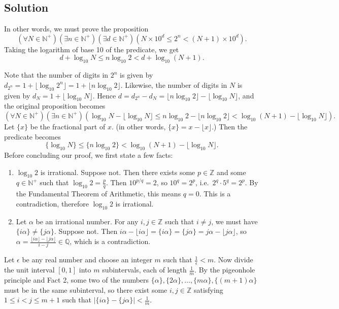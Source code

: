 \documentclass{article}
\begin{document}
\subsection*{Solution}
    In other words, we must prove the proposition $$(\forall N \in \mathbb{N}^{+})(\exists n \in \mathbb{N}^{+})(\exists d \in \mathbb{N}^{+})(N \times 10^{d} \le 2^{n} < (N + 1) \times 10^{d}).$$ Taking the logarithm of base 10 of the predicate, we get $$d + \log_{10}N \le n \log_{10}2 < d + \log_{10}(N + 1).$$
    
    Note that the number of digits in $2^{n}$ is given by $d_{2^{n}} = 1 + \lfloor \log_{10}2^{n} \rfloor = 1 + \lfloor n\log_{10}2 \rfloor$. Likewise, the number of digits in $N$ is given by $d_{N} = 1 + \lfloor \log_{10}N \rfloor$. Hence $d = d_{2^{n}} - d_{N} = \lfloor n\log_{10}2 \rfloor - \lfloor \log_{10}N \rfloor$, and the original proposition becomes $$(\forall N \in \mathbb{N}^{+})(\exists n \in \mathbb{N}^{+}) (\log_{10}N - \lfloor \log_{10}N \rfloor \le n \log_{10}2 - \lfloor n\log_{10}2 \rfloor  < \log_{10}(N + 1) - \lfloor \log_{10}N \rfloor).$$ Let $\{x\}$ be the fractional part of $x$. (in other words, $\{x\} = x - \lfloor x \rfloor$.) Then the predicate becomes 
    \begin{equation}
        \{\log_{10}N\} \le \{n \log_{10}2\} < \log_{10}(N + 1) - \lfloor \log_{10}N \rfloor.
    \end{equation}
    Before concluding our proof, we first state a few facts:
    \begin{enumerate}[label = \textbf{Fact \arabic*:}, leftmargin = *]
        \item $\log_{10} 2$ is irrational. Suppose not. Then there exists some $p \in \mathbb{Z}$ and some $q \in \mathbb{N^{+}}$ such that $\log_{10}2 = \frac{p}{q}$. Then $10^{p/q} = 2$, so $10^{q} = 2^{p}$, i.e.\ $2^{q} \cdot 5^{q} = 2^{p}$. By the Fundamental Theorem of Arithmetic, this means $q = 0$. This is a contradiction, therefore $\log_{10}2$ is irrational.
        \item  Let $\alpha$ be an irrational number. For any $i, j \in \mathbb{Z}$ such that $i \ne j$, we must have $\{i\alpha\} \ne \{j\alpha\}$. Suppose not. Then $i\alpha - \lfloor i\alpha \rfloor =  \{i\alpha\} = \{j\alpha\} = j\alpha - \lfloor j\alpha \rfloor$, so $\alpha = \frac{\lfloor i\alpha \rfloor - \lfloor j\alpha \rfloor}{i- j} \in \mathbb{Q}$, which is a contradiction.
    \end{enumerate}
    Let $\epsilon$ be any real number and choose an integer $m$ such that $\frac{1}{\epsilon} < m$. Now divide the unit interval $[0, 1]$ into $m$ subintervals, each of length $\frac{1}{m}$. By the pigeonhole principle and Fact 2, some two of the numbers $\{\alpha\}, \{2\alpha\}, \dots, \{m\alpha\}, \{(m + 1)\alpha\}$ must be in the same subinterval, so there exist some $i, j \in \mathbb{Z}$ satisfying $1 \le i < j \le m + 1$ such that $|\{i\alpha\} - \{j\alpha\}| < \frac{1}{m}$. 
    
\end{document}
